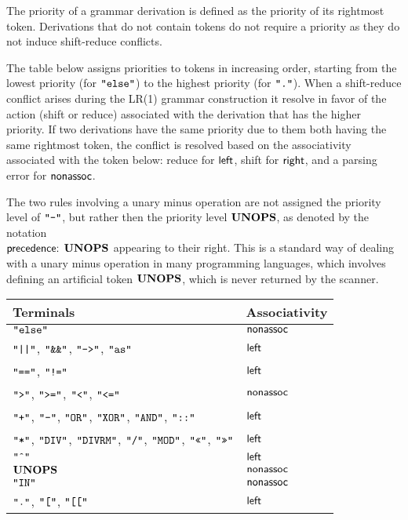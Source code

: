 The priority of a grammar derivation is defined as the priority of its rightmost token.
Derivations that do not contain tokens do not require a priority as they do not induce shift-reduce conflicts.

The table below assigns priorities to tokens in increasing order, starting from the lowest priority (for $\Telse$)
to the highest priority (for $\Tdot$).
When a shift-reduce conflict arises during the LR(1) grammar construction
it resolve in favor of the action (shift or reduce) associated with the derivation that has the higher priority.
If two derivations have the same priority due to them both having the same rightmost token,
the conflict is resolved based on the associativity associated with the token below:
reduce for $\leftassoc$, shift for $\rightassoc$, and a parsing error for $\nonassoc$.

The two rules involving a unary minus operation are not assigned the priority level of $\Tminus$,
but rather then the priority level $\Tunops$, as denoted by the notation \\
$\precedence{\Tunops}$
appearing to their right. This is a standard way of dealing with a unary minus operation
in many programming languages, which involves defining an artificial token $\Tunops$,
which is never returned by the scanner.

\begin{center}
\begin{tabular}{ll}
\textbf{Terminals} & \textbf{Associativity}\\
\hline
$\Telse$ & $\nonassoc$\\
$\Tbor$, $\Tband$, $\Timpl$, $\Tas$ & $\leftassoc$\\
$\Teqop$, $\Tneq$ & $\leftassoc$\\
$\Tgt$, $\Tgeq$, $\Tlt$, $\Tleq$ & $\nonassoc$\\
$\Tplus$, $\Tminus$, $\Tor$, $\Txor$, $\Tand$, $\Tcoloncolon$ & $\leftassoc$\\
$\Tmul$, $\Tdiv$, $\Tdivrm$, $\Trdiv$, $\Tmod$, $\Tshl$, $\Tshr$ & $\leftassoc$\\
$\Tpow$ & $\leftassoc$\\
$\Tunops$ & $\nonassoc$\\
$\Tin$ & $\nonassoc$\\
$\Tdot$, $\Tlbracket$, $\Tllbracket$ & $\leftassoc$
\end{tabular}
\end{center}
